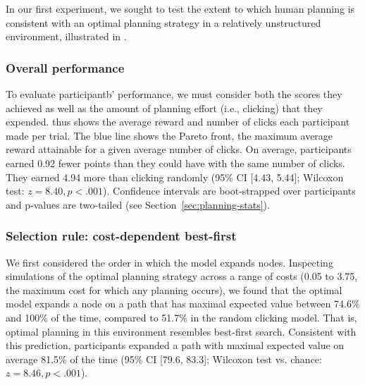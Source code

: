 In our first experiment, we sought to test the extent to which human planning is consistent with an optimal planning strategy in a relatively unstructured environment, illustrated in .

\subsubsection{Overall performance}\label{sec:planning-overall}

To evaluate participantb' performance, we must consider both the scores they achieved as well as the amount of planning effort (i.e., clicking) that they expended.  thus shows the average reward and number of clicks each participant made per trial. The blue line shows the Pareto front, the maximum average reward attainable for a given average number of clicks. On average, participants earned 0.92 fewer points than they could have with the same number of clicks. They earned 4.94 more than clicking randomly (95\% CI [4.43, 5.44]; Wilcoxon test: $z = 8.40, p < .001$). Confidence intervals are boot-strapped over participants and p-values are two-tailed (see Section~\ref{sec:planning-stats}).

\subsubsection{Selection rule: cost-dependent best-first}\label{sec:planning-selection}
We first considered the order in which the model expands nodes. Inspecting simulations of the optimal planning strategy across a range of costs (0.05 to 3.75, the maximum cost for which any planning occurs), we found that the optimal model expands a node on a path that has maximal expected value between 74.6\% and 100\% of the time, compared to 51.7\% in the random clicking model.
That is, optimal planning in this environment resembles best-first search. Consistent with this prediction, participants expanded a path with maximal expected value on average 81.5\% of the time (95\% CI [79.6, 83.3]; Wilcoxon test vs. chance: $z = 8.46, p < .001$).

